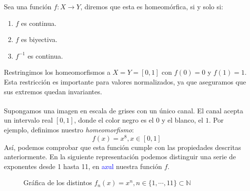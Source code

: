 \begin{definition}
    Sea una función \(f:X\longrightarrow Y\), diremos que esta es homeomórfica, si y solo si:
    \begin{enumerate}
        \item \(f\) es continua.
        \item \(f\) es biyectiva.
        \item \(f^{-1}\) es continua.
    \end{enumerate}
\end{definition}
Restringimos los homeomorfismos a \(X=Y=[0,1]\) con \(f(0)=0\) y \(f(1)=1\). Esta restricción es importante para valores normalizados, ya que aseguramos que sus extremos quedan invariantes.\\\\
Supongamos una imagen en escala de grises con un único canal. El canal acepta un intervalo real \([0, 1]\), donde el color negro es el \(0\) y el blanco, el \(1\). Por ejemplo, definimos nuestro \textit{homeomorfismo}:
\[f(x)=x^8, x \in [0, 1]\]
Así, podemos comprobar que esta función cumple con las propiedades descritas anteriormente. En la siguiente representación podemos distinguir una serie de exponentes desde 1 hasta 11, en \textcolor{blue}{azul} nuestra función \(f\).
\begin{figure}[H]
    \centering
    \captionsetup{justification=centering}%
    \caption{Gráfica de los distintos \(f_n(x)=x^n, n\in\{1,\cdots,11\}\subset \mathbb{N}\) } \label{fig:M1}
\end{figure}
